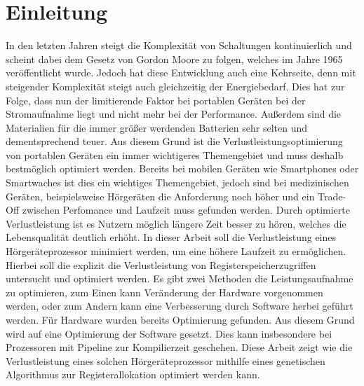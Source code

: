 
\thispagestyle{empty}
%
\chapter{Einleitung}
\label{chap:introduction}
In den letzten Jahren steigt die Komplexität von Schaltungen kontinuierlich und scheint dabei dem Gesetz von Gordon Moore zu folgen, welches im Jahre 1965 veröffentlicht wurde. Jedoch hat diese Entwicklung auch eine Kehrseite, denn mit steigender Komplexität steigt auch gleichzeitig der Energiebedarf. Dies hat zur Folge, dass nun der limitierende Faktor bei portablen Geräten bei der Stromaufnahme liegt und nicht mehr bei der Performance. Außerdem sind die Materialien für die immer größer werdenden Batterien sehr selten und dementsprechend teuer. Aus diesem Grund ist die Verlustleistungsoptimierung von portablen Geräten ein immer wichtigeres Themengebiet und muss deshalb bestmöglich optimiert werden. Bereits bei mobilen Geräten wie Smartphones oder Smartwaches ist dies ein wichtiges Themengebiet, jedoch sind bei medizinischen Geräten, beispielsweise Hörgeräten die Anforderung noch höher und ein Trade-Off zwischen Perfomance und Laufzeit muss gefunden werden. Durch optimierte Verlustleistung ist es Nutzern möglich längere Zeit besser zu hören, welches die Lebensqualität deutlich erhöht.
In dieser Arbeit soll die Verlustleistung eines Hörgeräteprozessor minimiert werden, um eine höhere Laufzeit zu ermöglichen. Hierbei soll die explizit die Verlustleistung von Registerspeicherzugriffen untersucht und optimiert werden. 
Es gibt zwei Methoden die Leistungsaufnahme zu optimieren, zum Einen kann Veränderung der Hardware vorgenommen werden, oder zum Andern kann eine Verbesserung durch Software herbei geführt werden. Für Hardware wurden bereits Optimierung gefunden. Aus diesem Grund wird auf eine Optimierung der Software gesetzt. Dies kann insbesondere bei Prozessoren mit Pipeline zur Kompilierzeit geschehen. 
Diese Arbeit zeigt wie die Verlustleistung eines solchen Hörgeräteprozessor mithilfe eines genetischen Algorithmus zur Registerallokation optimiert werden kann.


